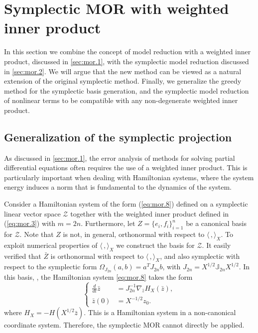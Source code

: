 \section{Symplectic MOR with weighted inner product} \label{sec:normmor}

In this section we combine the concept of model reduction with a weighted inner product, discussed in \cref{sec:mor.1}, with the symplectic model reduction discussed in \cref{sec:mor.2}. We will argue that the new method can be viewed as a natural extension of the original symplectic method. Finally, we generalize the greedy method for the symplectic basis generation, and the symplectic model reduction of nonlinear terms to be compatible with any non-degenerate weighted inner product.

\subsection{Generalization of the symplectic projection} \label{sec:normmor.1}
As discussed in \cref{sec:mor.1}, the error analysis of methods for solving partial differential equations often requires the use of a weighted inner product. This is particularly important when dealing with Hamiltonian systems, where the system energy induces a norm that is fundamental to the dynamics of the system.
   
Consider a Hamiltonian system of the form (\ref{eq:mor.8}) defined on a symplectic linear vector space $\mathcal Z$ together with the weighted inner product defined in (\ref{eq:mor.3}) with $m=2n$. Furthermore, let $Z = \{ e_i,f_i \}_{i=1}^n$ be a canonical  basis for $\mathcal Z$. Note that $Z$ is not, in general, orthonormal with respect to $\langle\,,\rangle_X$. To exploit numerical properties of $\langle\,,\rangle_X$ we construct the basis  for $\mathcal Z$. It easily verified that $\bar Z$ is orthonormal with respect to $\langle\,,\rangle_X$, and also symplectic with respect to the symplectic form $\Omega_{J_{2n}}(a,b) = a^T J_{2n} b $, with $J_{2n} = X^{1/2} \mathbb J_{2n}X^{1/2}$. In this basis, , the Hamiltonian system \eqref{eq:mor.8} takes the form
\begin{equation} \label{p1.eq:nommor.0.1}
	\left\{
	\begin{aligned}
		\frac d {dt} \bar z &= J^{-1}_{2n} \nabla_{\bar z} H_X(\bar z), \\
		\bar z(0) &= X^{-1/2}z_0.
	\end{aligned}
	\right.
\end{equation}
where $H_X = -H(X^{1/2}\bar z)$. This is a Hamiltonian system in a non-canonical coordinate system. Therefore, the symplectic MOR cannot directly be applied.

